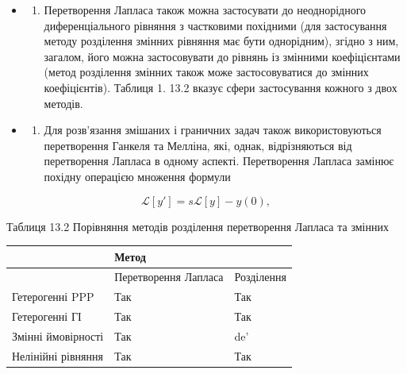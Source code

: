 \documentclass[
  ukrainian,
]{article}
\newcounter{none} %
\providecommand{\tightlist}{%
  \setlength{\itemsep}{0pt}\setlength{\parskip}{0pt}}
\begin{document}
\begin{itemize}
\tightlist
\item
  \begin{enumerate}
  \def\labelenumi{\arabic{enumi}.}
  \tightlist
  \item
    Перетворення Лапласа також можна застосувати до неоднорідного
    диференціального рівняння з частковими похідними (для застосування
    методу розділення змінних рівняння має бути однорідним), згідно з
    ним, загалом, його можна застосовувати до рівнянь із змінними
    коефіцієнтами (метод розділення змінних також може застосовуватися
    до змінних коефіцієнтів). Таблиця 1. 13.2 вказує сфери застосування
    кожного з двох методів.
  \end{enumerate}
\item
  \begin{enumerate}
  \def\labelenumi{\arabic{enumi}.}
  \setcounter{enumi}{1}
  \tightlist
  \item
    Для розв'язання змішаних і граничних задач також використовуються
    перетворення Ганкеля та Мелліна, які, однак, відрізняються від
    перетворення Лапласа в одному аспекті. Перетворення Лапласа замінює
    похідну операцією множення формули
  \end{enumerate}
\end{itemize}

\[
\mathscr{L}[y'] = s\mathscr{L}[y] - y(0),
\]

Таблиця 13.2 Порівняння методів розділення перетворення Лапласа та
змінних

{\def\LTcaptype{none} %
\begin{longtable}[]{@{}
  >{\raggedright\arraybackslash}p{}
  >{\raggedright\arraybackslash}p{}
  >{\raggedright\arraybackslash}p{}@{}}
\toprule\noalign{}
\begin{minipage}[b]{\linewidth}\raggedright
\end{minipage} & \begin{minipage}[b]{\linewidth}\raggedright
Метод
\end{minipage} & \begin{minipage}[b]{\linewidth}\raggedright
\end{minipage} \\
\midrule\noalign{}
\endhead
\bottomrule\noalign{}
\endlastfoot
& Перетворення Лапласа & Розділення \\
Гетерогенні PPP & Так & Так \\
Гетерогенні ГІ & Так & Так \\
Змінні ймовірності & Так & de' \\
Нелінійні рівняння & Так & Так \\
\end{longtable}
}
\end{document}
